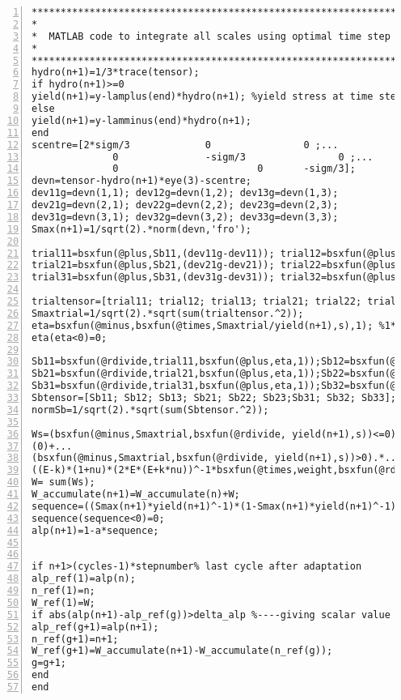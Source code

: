 \clearpage
\begin{lstlisting}[numbers=left, numberstyle=\tiny, keywordstyle=\color{blue!100}, commentstyle=\color{red!30!green!100!blue!100}, frame=shadowbox, rulesepcolor=\color{red!20!green!20!blue!20}]
********************************************************************
*
*  MATLAB code to integrate all scales using optimal time step strategy
*               
********************************************************************
hydro(n+1)=1/3*trace(tensor);
if hydro(n+1)>=0
yield(n+1)=y-lamplus(end)*hydro(n+1); %yield stress at time step n+1
else
yield(n+1)=y-lamminus(end)*hydro(n+1);    
end
scentre=[2*sigm/3             0                0 ;...
              0               -sigm/3                0 ;...
              0                        0       -sigm/3];
devn=tensor-hydro(n+1)*eye(3)-scentre;
dev11g=devn(1,1); dev12g=devn(1,2); dev13g=devn(1,3);
dev21g=devn(2,1); dev22g=devn(2,2); dev23g=devn(2,3);
dev31g=devn(3,1); dev32g=devn(3,2); dev33g=devn(3,3);
Smax(n+1)=1/sqrt(2).*norm(devn,'fro');

trial11=bsxfun(@plus,Sb11,(dev11g-dev11)); trial12=bsxfun(@plus,Sb12,(dev12g-dev12));trial13=bsxfun(@plus,Sb13,(dev13g-dev13));
trial21=bsxfun(@plus,Sb21,(dev21g-dev21)); trial22=bsxfun(@plus,Sb22,(dev22g-dev22));trial23=bsxfun(@plus,Sb23,(dev23g-dev23));
trial31=bsxfun(@plus,Sb31,(dev31g-dev31)); trial32=bsxfun(@plus,Sb32,(dev32g-dev32));trial33=bsxfun(@plus,Sb33,(dev33g-dev33));

trialtensor=[trial11; trial12; trial13; trial21; trial22; trial23;trial31; trial32; trial33];
Smaxtrial=1/sqrt(2).*sqrt(sum(trialtensor.^2));
eta=bsxfun(@minus,bsxfun(@times,Smaxtrial/yield(n+1),s),1); %1*64
eta(eta<0)=0;

Sb11=bsxfun(@rdivide,trial11,bsxfun(@plus,eta,1));Sb12=bsxfun(@rdivide,trial12,bsxfun(@plus,eta,1));Sb13=bsxfun(@rdivide,trial13,bsxfun(@plus,eta,1));
Sb21=bsxfun(@rdivide,trial21,bsxfun(@plus,eta,1));Sb22=bsxfun(@rdivide,trial22,bsxfun(@plus,eta,1));Sb23=bsxfun(@rdivide,trial23,bsxfun(@plus,eta,1));
Sb31=bsxfun(@rdivide,trial31,bsxfun(@plus,eta,1));Sb32=bsxfun(@rdivide,trial32,bsxfun(@plus,eta,1));Sb33=bsxfun(@rdivide,trial33,bsxfun(@plus,eta,1));
Sbtensor=[Sb11; Sb12; Sb13; Sb21; Sb22; Sb23;Sb31; Sb32; Sb33];
normSb=1/sqrt(2).*sqrt(sum(Sbtensor.^2));

Ws=(bsxfun(@minus,Smaxtrial,bsxfun(@rdivide, yield(n+1),s))<=0).*...
(0)+...
(bsxfun(@minus,Smaxtrial,bsxfun(@rdivide, yield(n+1),s))>0).*...
((E-k)*(1+nu)*(2*E*(E+k*nu))^-1*bsxfun(@times,weight,bsxfun(@rdivide,bsxfun(@times,bsxfun(@minus,Smaxtrial,bsxfun(@rdivide, yield(n+1),s)),yield(n+1)),s)));
W= sum(Ws);
W_accumulate(n+1)=W_accumulate(n)+W;
sequence=((Smax(n+1)*yield(n+1)^-1)*(1-Smax(n+1)*yield(n+1)^-1)^-1)^fb;
sequence(sequence<0)=0;
alp(n+1)=1-a*sequence;


if n+1>(cycles-1)*stepnumber% last cycle after adaptation
alp_ref(1)=alp(n);
n_ref(1)=n;
W_ref(1)=W;
if abs(alp(n+1)-alp_ref(g))>delta_alp %----giving scalar value to iteration after the addaptation cycle(decrease time step)
alp_ref(g+1)=alp(n+1);
n_ref(g+1)=n+1;
W_ref(g+1)=W_accumulate(n+1)-W_accumulate(n_ref(g));
g=g+1;
end
end

\end{lstlisting}

